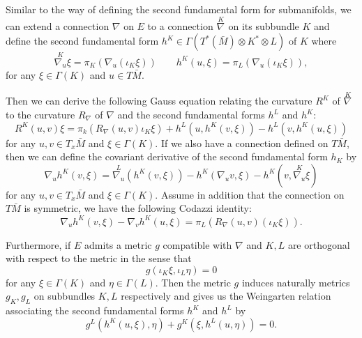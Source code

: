 Similar to the way of defining the second fundamental form for submanifolds, we can extend a connection $\nabla$  on $E$ to a connection $\overset{K}{\nabla_{}} $ on its subbundle $K$ and define the second fundamental form $h^K \in \Gamma (T^*(\bar{M}) \otimes K^* \otimes L)$ of $K$ where
\begin{equation*}
    \overset{K}{\nabla_{u}} \xi = \pi _K(\nabla_{u}^{} (\iota _K \xi )) \qquad 
    h^K(u,\xi )=\pi _L(\nabla_{u}^{} (\iota _K \xi )),
\end{equation*}
for any $\xi \in \Gamma (K)$ and $u \in T\bar{M}.$

Then we can derive the following Gauss equation relating the curvature $R^K$ of $\overset{K}{\nabla_{}} $ to the curvature $R_{\nabla }$ of $\nabla $ and the second fundamental forms $h^L$ and $h^K$:
\begin{equation*}
    R^K(u,v)\xi = \pi _k(R_{\nabla }(u,v)\iota _K \xi )+h^L(u,h^K(v,\xi ))-h^L(v,h^K(u,\xi ))
\end{equation*} 
for any $u,v \in T_x\bar{M}$ and $\xi \in \Gamma (K)$. If we also have a connection defined on $T\bar{M} $, then we can define the covariant derivative of the second fundamental form $h_K$ by 
\begin{equation*}
    \nabla_{u}^{} h^K(v,\xi) = \overset{L}{\nabla_{u}} (h^K(v,\xi ))-h^K(\nabla_{u}^{} v,\xi )-h^K(v, \overset{K}{\nabla_{u}} \xi )
\end{equation*}
for any $u,v \in T_x\bar{M}$ and $\xi \in \Gamma (K)$. Assume in addition that the connection on $T\bar{M} $ is symmetric, we have the following Codazzi identity:
\begin{equation} \label{Codazzi}
    \nabla_{u}^{} h^K(v, \xi )-  \nabla_{v}^{} h^K(u, \xi ) =\pi _L(R_{\nabla }(u,v)(\iota _K \xi )).
\end{equation}

Furthermore, if $E$ admits a metric $g$ compatible with $\nabla $ and $K,L$ are orthogonal with respect to the metric in the sense that 
\begin{equation*}
    g(\iota _K \xi ,\iota _L \eta  )=0
\end{equation*}
for any $\xi \in \Gamma (K)$ and $\eta \in \Gamma (L)$. Then the metric $g$ induces naturally metrics $g_K, g_L$ on subbundles $K,L$ respectively and gives us the Weingarten relation associating the second fundamental forms $h^K$ and $h^L$ by 
\begin{equation*}
    g^L(h^K(u,\xi ), \eta )+g^K(\xi ,h^L(u,\eta ))=0.
\end{equation*}

